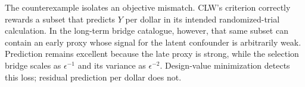 The counterexample isolates an objective mismatch. CLW's criterion correctly rewards a subset that predicts \(Y\) per dollar in its intended randomized-trial calculation. In the long-term bridge catalogue, however, that same subset can contain an early proxy whose signal for the latent confounder is arbitrarily weak. Prediction remains excellent because the late proxy is strong, while the selection bridge scales as \(\epsilon^{-1}\) and its variance as \(\epsilon^{-2}\). Design-value minimization detects this loss; residual prediction per dollar does not.